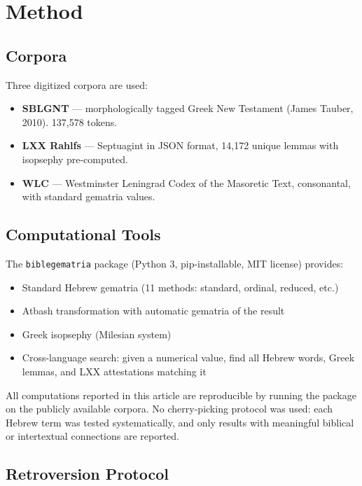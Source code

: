 \documentclass[12pt,a4paper]{article}
\begin{document}
\section{Method}

\subsection{Corpora}

Three digitized corpora are used:
\begin{itemize}
    \item \textbf{SBLGNT} --- morphologically tagged Greek New Testament (James Tauber, 2010). 137,578 tokens.
    \item \textbf{LXX Rahlfs} --- Septuagint in JSON format, 14,172 unique lemmas with isopsephy pre-computed.
    \item \textbf{WLC} --- Westminster Leningrad Codex of the Masoretic Text, consonantal, with standard gematria values.
\end{itemize}

\subsection{Computational Tools}

The \texttt{biblegematria} package (Python 3, pip-installable, MIT license) provides:
\begin{itemize}
    \item Standard Hebrew gematria (11 methods: standard, ordinal, reduced, etc.)
    \item Atbash transformation with automatic gematria of the result
    \item Greek isopsephy (Milesian system)
    \item Cross-language search: given a numerical value, find all Hebrew words, Greek lemmas, and LXX attestations matching it
\end{itemize}

All computations reported in this article are reproducible by running the package on the publicly available corpora. No cherry-picking protocol was used: each Hebrew term was tested systematically, and only results with meaningful biblical or intertextual connections are reported.

\subsection{Retroversion Protocol}
\end{document}
